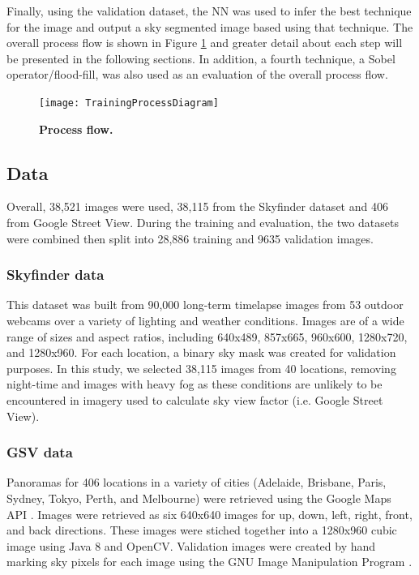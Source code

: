 \documentclass[final,3p,times,authoryear]{elsarticle}
\begin{document}
Finally, using the validation dataset, the NN was used to infer the best technique for the image and output a sky segmented image based using that technique. The overall process flow is shown in Figure \ref{fig:process} and greater detail about each step will be presented in the following sections. In addition, a fourth technique, a Sobel operator/flood-fill, was also used as an evaluation of the overall process flow.

\begin{figure}
\centering    
\texttt{[image: TrainingProcessDiagram]}
\caption{\bf  Process flow.}    
 \label{fig:process}  
\end{figure} 


\subsection{Data}\label{sec:data}
Overall, 38,521 images were used, 38,115 from the Skyfinder dataset and 406 from Google Street View. During the training and evaluation, the two datasets were combined then split into 28,886 training and 9635 validation images.


\subsubsection{Skyfinder data}\label{sec:finderdata}
This dataset was built from 90,000 long-term timelapse images from 53 outdoor webcams over a variety of lighting and weather conditions. Images are of a wide range of sizes and aspect ratios, including 640x489, 857x665, 960x600, 1280x720, and 1280x960. For each location, a binary sky mask was created for validation purposes. In this study, we selected 38,115 images from 40 locations, removing night-time and images with heavy fog as these conditions are unlikely to be encountered in imagery used to calculate sky view factor (i.e. Google Street View).

\subsubsection{GSV data}\label{sec:gsvdata}
Panoramas for 406 locations in a variety of cities (Adelaide, Brisbane, Paris, Sydney, Tokyo, Perth, and Melbourne) were retrieved using the Google Maps API \citep{GoogleMaps2017b}. Images were retrieved as six 640x640 images for up, down, left, right, front, and back directions. These images were stiched together into a 1280x960 cubic image using Java 8 \citep{Oracle2018} and OpenCV\citep {Bradski2000}. Validation images were created by hand marking sky pixels for each image using the GNU Image Manipulation Program \citep{GIMP2019}.
\end{document}
